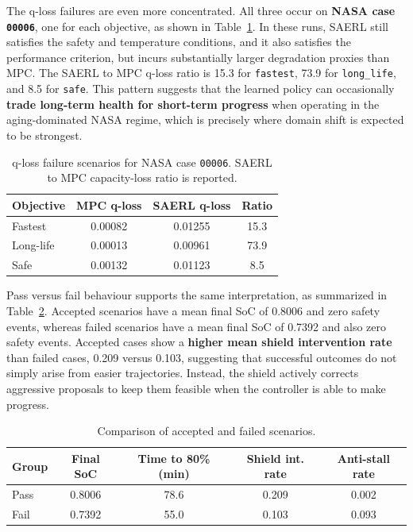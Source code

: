 \documentclass[%
 aip,
 amsmath,amssymb,
reprint, onecolumn %
]{revtex4-1}
\begin{document}
The q-loss failures are even more concentrated. All three occur on \textbf{NASA case \texttt{00006}}, one for each objective, as shown in Table~\ref{tab_qloss_failure_cases}. In these runs, SAERL still satisfies the safety and temperature conditions, and it also satisfies the performance criterion, but incurs substantially larger degradation proxies than MPC. The SAERL to MPC q-loss ratio is 15.3 for \texttt{fastest}, 73.9 for \texttt{long\_life}, and 8.5 for \texttt{safe}. This pattern suggests that the learned policy can occasionally \textbf{trade long-term health for short-term progress} when operating in the aging-dominated NASA regime, which is precisely where domain shift is expected to be strongest.

\begin{table}[t]
\centering
\caption{q-loss failure scenarios for NASA case \texttt{00006}. SAERL to MPC capacity-loss ratio is reported.}
\label{tab_qloss_failure_cases}
\begin{tabular}{lccc}
\toprule
Objective & MPC q-loss & SAERL q-loss & Ratio \\
\midrule
Fastest & 0.00082 & 0.01255 & 15.3 \\
Long-life & 0.00013 & 0.00961 & 73.9 \\
Safe & 0.00132 & 0.01123 & 8.5 \\
\bottomrule
\end{tabular}
\end{table}

Pass versus fail behaviour supports the same interpretation, as summarized in Table~\ref{tab_pass_fail_compare}. Accepted scenarios have a mean final SoC of 0.8006 and zero safety events, whereas failed scenarios have a mean final SoC of 0.7392 and also zero safety events. Accepted cases show a \textbf{higher mean shield intervention rate} than failed cases, 0.209 versus 0.103, suggesting that successful outcomes do not simply arise from easier trajectories. Instead, the shield actively corrects aggressive proposals to keep them feasible when the controller is able to make progress.

\begin{table}[t]
\centering
\caption{Comparison of accepted and failed scenarios.}
\label{tab_pass_fail_compare}
\begin{tabular}{lcccc}
\toprule
Group & Final SoC & Time to 80\% (min) & Shield int. rate & Anti-stall rate \\
\midrule
Pass & 0.8006 & 78.6 & 0.209 & 0.002 \\
Fail\footnotemark[1] & 0.7392 & 55.0 & 0.103 & 0.093 \\
\bottomrule
\end{tabular}
\\[3pt]
\raggedright
{}

\end{table}
\end{document}
